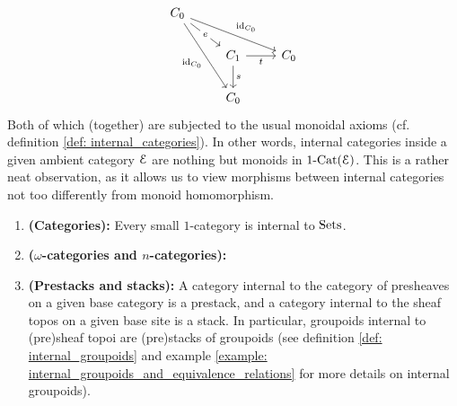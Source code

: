 \begin{remark}
$$\begin{tikzcd}
                        	{C_0} \\
                        	& {C_1} & {C_0} \\
                        	& {C_0}
                        	\arrow["s", from=2-2, to=3-2]
                        	\arrow["t"', from=2-2, to=2-3]
                        	\arrow["e"{description}, from=1-1, to=2-2]
                        	\arrow["{\id_{C_0}}"', from=1-1, to=3-2]
                        	\arrow["{\id_{C_0}}", from=1-1, to=2-3]
                        \end{tikzcd}
                    $$
                Both of which (together) are subjected to the usual monoidal axioms (cf. definition \ref{def: internal_categories}). In other words, internal categories inside a given ambient category $\mathcal{E}$ are nothing but monoids in $1\text{-}\mathrm{Cat}(\mathcal{E})$. This is a rather neat observation, as it allows us to view morphisms between internal categories not too differently from monoid homomorphism. 
            \end{remark}
            
            \begin{example} \label{example: internal_categories}
                \noindent
                \begin{enumerate}
                    \item \textbf{(Categories):} Every small $1$-category is internal to $\mathrm{Sets}$.
                    \item \textbf{($\omega$-categories and $n$-categories):} 
                    \item \textbf{(Prestacks and stacks):} A category internal to the category of presheaves on a given base category is a prestack, and a category internal to the sheaf topos on a given base site is a stack. In particular, groupoids internal to (pre)sheaf topoi are (pre)stacks of groupoids (see definition \ref{def: internal_groupoids} and example \ref{example: internal_groupoids_and_equivalence_relations} for more details on internal groupoids).  
                \end{enumerate}
            \end{example}
            
